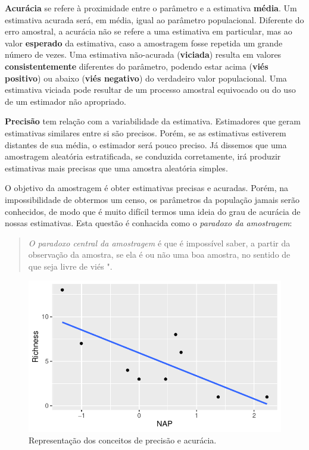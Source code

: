 \documentclass[
]{book}
\begin{document}
\textbf{Acurácia} se refere à proximidade entre o parâmetro e a estimativa \textbf{média}. Um estimativa acurada será, em média, igual ao parâmetro populacional. Diferente do erro amostral, a acurácia não se refere a uma estimativa em particular, mas ao valor \textbf{esperado} da estimativa, caso a amostragem fosse repetida um grande número de vezes.
Uma estimativa não-acurada (\textbf{viciada}) resulta em valores \textbf{consistentemente} diferentes do parâmetro, podendo estar acima (\textbf{viés positivo}) ou abaixo (\textbf{viés negativo}) do verdadeiro valor populacional. Uma estimativa viciada pode resultar de um processo amostral equivocado ou do uso de um estimador não apropriado.

\textbf{Precisão} tem relação com a variabilidade da estimativa. Estimadores que geram estimativas similares entre si são precisos. Porém, se as estimativas estiverem distantes de sua média, o estimador será pouco preciso. Já dissemos que uma amostragem aleatória estratificada, se conduzida corretamente, irá produzir estimativas mais precisas que uma amostra aleatória simples.

O objetivo da amostragem é obter estimativas precisas e acuradas. Porém, na impossibilidade de obtermos um censo, os parâmetros da população jamais serão conhecidos, de modo que é muito difícil termos uma ideia do grau de acurácia de nossas estimativas. Esta questão é conhacida como o \emph{paradoxo da amostragem}:

\begin{quote}
\emph{O paradoxo central da amostragem} é que é impossível saber, a partir da observação da amostra, se ela é ou não uma boa amostra, no sentido de que seja livre de viés \citep{stuart1984ideas}".
\end{quote}

\begin{figure}

{\centering \includegraphics{probest-cambientais_files/figure-latex/unnamed-chunk-51-1} 

}

\caption{Representação dos conceitos de precisão e acurácia.}\label{fig:unnamed-chunk-51}
\end{figure}
\end{document}

